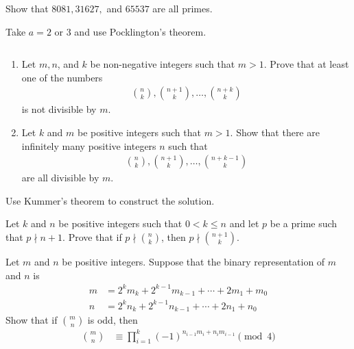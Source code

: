 \begin{problem}
	Show that $8081, 31627,$ and $65537$ are all primes.
\end{problem}
\begin{hint}
	Take $a=2$ or $3$ and use Pocklington's theorem.
\end{hint}

\begin{problem}
	$ $
	\begin{enumerate}
		\item Let $m,n$, and $k$ be non-negative integers such that $m>1$. Prove that at least one of the numbers
			\begin{align*}
				\binom{n}{k}, \binom{n+1}{k}, \ldots,\binom{n+k}{k}
			\end{align*}
	 is not divisible by $m$.
	 \item Let $k$ and $m$ be positive integers such that $m>1$. Show that there are infinitely many positive integers $n$ such that
		 \begin{align*}
			 \binom{n}{k}, \binom{n+1}{k}, \ldots, \binom{n+k-1}{k}
		 \end{align*}
	 are all divisible by $m$.
	\end{enumerate}
\end{problem}

\begin{hint}
	Use Kummer's theorem to construct the solution.
\end{hint}

\begin{problem}
	Let $k$ and $n$ be positive integers such that $0<k\leq n$ and let $p$ be a prime such that $p \nmid n+1$. Prove that if $p\nmid\binom{n}{k}$, then $p \nmid\binom{n+1}{k}$.
\end{problem}

\begin{problem}
	Let $m$ and $n$ be positive integers. Suppose that the binary representation of $m$ and $n$ is
		\begin{align*}
			m   &= 2^km_k+2^{k-1}m_{k-1}+\cdots +2m_1+m_0\\
			n   &= 2^kn_k+2^{k-1}n_{k-1}+\cdots +2n_1+n_0
		\end{align*}
	Show that if $\binom{m}{n}$ is odd, then
		\begin{align*}
			\binom{m}{n}
				& \equiv \prod_{i=1}^{k} (-1)^{n_{i-1}m_i+n_im_{i-1}} \pmod 4
		\end{align*}
\end{problem}


